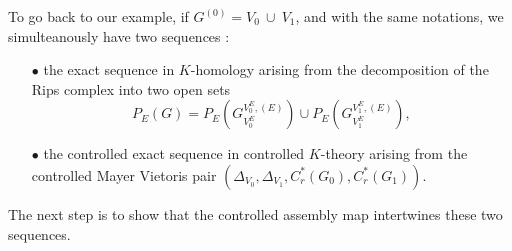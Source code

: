 To go back to our example, if $G^{(0)} = V_0\ \cup \ V_1 $, and with the same notations, we simulteanously have two sequences : \\
\begin{itemize}
\item[$\bullet$] the exact sequence in $K$-homology arising from the decomposition of the Rips complex into two open sets 
\[P_E(G) = P_E(G^{V_0^E,(E)}_{V_0^E}) \cup P_E(G^{V_1^E,(E)}_{V_1^E}) ,\] 
\item[$\bullet$] the controlled exact sequence in controlled $K$-theory arising from the controlled Mayer Vietoris pair $(\Delta_{V_0},\Delta_{V_1}, C_r^*(G_0),C_r^*(G_1))$. \\
\end{itemize}
The next step is to show that the controlled assembly map intertwines these two sequences. %



%























 

      
